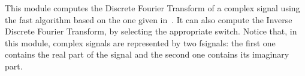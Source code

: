 This module computes the Discrete Fourier Transform of a complex signal using the 
fast algorithm based on the one given in~\cite{press.flannery.ea:numerical}.
It can also compute the Inverse Discrete Fourier Transform, by selecting the appropriate
switch.
Notice that, in this module, complex signals are represented by two fsignals: 
the first one contains the real part of the signal and the second one contains its 
imaginary part. 

